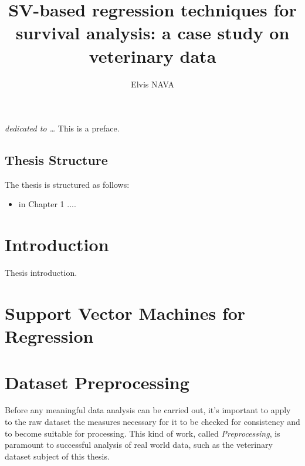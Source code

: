 \documentclass[12pt]{report}
\begin{document}
\title{SV-based regression techniques for survival analysis: a case study on veterinary data}
\author{Elvis NAVA}
%
% 
%
\beforepreface
\prefacesection{}
        {\hfill \Large {\sl dedicated to \dots}}
% 
%
This is a preface.
%
%
\section*{Thesis Structure}
\label{structure}
The thesis is structured as follows:
\begin{itemize}
\item in Chapter 1 ....
\end{itemize}
%
%
% 

\chapter*{Introduction}
\label{intro}
Thesis introduction.

% 
%
\chapter{Support Vector Machines for Regression}
\label{ch1}

\chapter{Dataset Preprocessing}
\label{ch2}
Before any meaningful data analysis can be carried out, it's important to apply to the raw dataset the measures necessary for it to be checked for consistency and to become suitable for processing. This kind of work, called \textit{Preprocessing}, is paramount to successful analysis of real world data, such as the veterinary dataset subject of this thesis.
\end{document}
